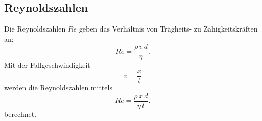\subsection{Reynoldszahlen}
Die Reynoldszahlen $Re$ geben das Verhältnis von Trägheits- zu
Zähigkeitskräften an:
\begin{equation*}
    Re = \frac{\rho \, v \, d}{\eta}.
\end{equation*}
Mit der Fallgeschwindigkeit
\begin{equation}
    v = \frac{x}{t}
    \label{eqn:v}
\end{equation}
werden die Reynoldszahlen mittels
\begin{equation}
    Re = \frac{\rho \, x \, d}{\eta \, t}.
    \label{eqn:Re}
\end{equation}
berechnet.
